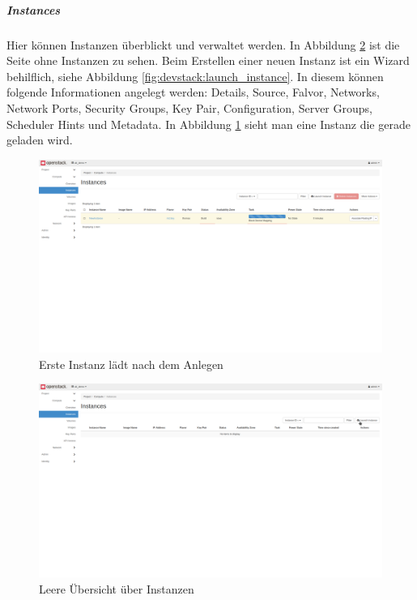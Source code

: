 \documentclass[a4paper,10pt]{article}
\numberwithin{figure}{section}
\numberwithin{table}{section}
\begin{document}
\subparagraph{Instances}

Hier können Instanzen überblickt und verwaltet werden.
In Abbildung \ref{fig:devstack:empty_instance} ist die Seite ohne Instanzen zu sehen.
Beim Erstellen einer neuen Instanz ist ein Wizard behilflich, siehe Abbildung \ref{fig:devstack:launch_instance}.
In diesem können folgende Informationen angelegt werden: Details, Source, Falvor, Networks, Network Ports, Security Groups, Key Pair, Configuration, Server Groups, Scheduler Hints und Metadata.
In Abbildung \ref{fig:devstack:loading_instance} sieht man eine Instanz die gerade geladen wird.

\begin{figure}[htbp]
\centering
\caption{Erste Instanz lädt nach dem Anlegen}
\label{fig:devstack:loading_instance}
\includegraphics[width=\textwidth, trim={0 17cm 0 0}, clip]{graphics/devstack/11_LaunchInstanceAlternative}
\end{figure}

\begin{figure}[htbp]
\centering
\caption{Leere Übersicht über Instanzen}
\label{fig:devstack:empty_instance}
\includegraphics[width=\textwidth, trim={0 17cm 0 0}, clip]{graphics/devstack/05_InstancesEmpty}
\end{figure}
\end{document}
